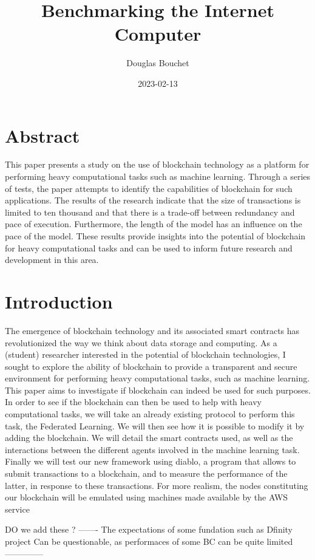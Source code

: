 \documentclass{article}
\title{Benchmarking the Internet Computer}
\date{2023-02-13}
\author{Douglas Bouchet}
\begin{document}
\maketitle
\newpage
{}

\tableofcontents

\newpage
\section{Abstract}
This paper presents a study on the use of blockchain technology as a platform for performing heavy computational tasks
such as machine learning. Through a series of tests, the paper attempts to identify the capabilities of blockchain for
such applications. The results of the research indicate that the size of transactions is limited to ten thousand
and that there is a trade-off between redundancy and pace of execution. Furthermore, the length of the model has an
influence on the pace of the model. These results provide insights into the potential of blockchain for heavy
computational tasks and can be used to inform future research and development in this area.
\newpage
\section{Introduction}
The emergence of blockchain technology and its associated smart contracts has revolutionized the way we think about data
storage and computing. As a (student) researcher interested in the potential of blockchain technologies, I sought to explore the
ability of blockchain to provide a transparent and secure environment for performing heavy computational tasks, such
as machine learning. This paper aims to investigate if blockchain can indeed be used for such purposes.
In order to see if the blockchain can then be used to help with heavy computational tasks, we will take an already
existing protocol to perform this task, the Federated Learning. We will then see how it is possible to modify it by adding the blockchain.
We will detail the smart contracts used, as well as the interactions between the different agents involved in the
machine learning task. Finally we will test our new framework using diablo, a program that allows to submit transactions
to a blockchain, and to measure the performance of the latter, in response to these transactions. For more realism,
 the nodes constituting our blockchain will be emulated using machines made available by the AWS service

DO we add these ? -------
The expectations of some fundation such as Dfinity project
Can be questionable, as performaces of some BC can be quite limited
--------------
\end{document}
